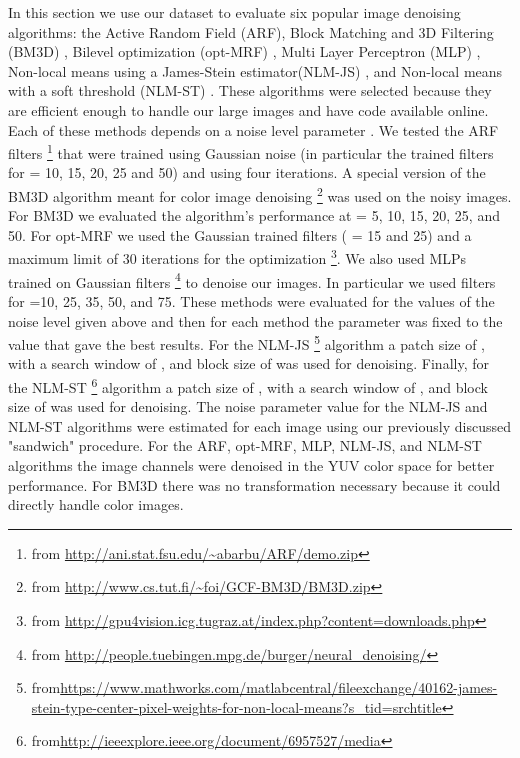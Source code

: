\documentclass[review]{elsarticle}
\begin{document}
In this section we use our dataset to evaluate six popular image denoising algorithms: the Active Random Field (ARF)\cite{barbu2009training}, Block Matching and 3D Filtering (BM3D) \cite{dabov2007image}, Bilevel optimization (opt-MRF) \cite{optMRF}, Multi Layer Perceptron (MLP) \cite{NeuralNetworkCompete}, Non-local means using a James-Stein estimator(NLM-JS) \cite{JS-NLM}, and Non-local means with a soft threshold (NLM-ST) \cite{lu2015non}. These algorithms were selected because they are efficient enough to handle our large images and have code available online. Each of these methods depends on a noise level parameter . We tested the ARF filters \footnote{from \url{http://ani.stat.fsu.edu/~abarbu/ARF/demo.zip}} that were trained using Gaussian noise (in particular the trained filters for  = 10, 15, 20, 25 and 50) and using four iterations. A special version of the BM3D algorithm meant for color image denoising \footnote{from \url{http://www.cs.tut.fi/~foi/GCF-BM3D/BM3D.zip}} was used on the noisy images. For BM3D we evaluated the algorithm's performance at  = 5, 10, 15, 20, 25, and 50. For opt-MRF we used the Gaussian trained filters ( = 15 and 25)  and a maximum limit of 30 iterations for the optimization \footnote{from \url{http://gpu4vision.icg.tugraz.at/index.php?content=downloads.php}}. We also used MLPs trained on Gaussian filters 
\footnote{from \url{http://people.tuebingen.mpg.de/burger/neural_denoising/}} to denoise our images. In particular we used filters for  =10, 25, 35, 50, and 75. These methods were evaluated for the values of the noise level  given above and then  for each method the parameter was fixed to the value that gave the best results. 
For the NLM-JS \footnote{from\url{https://www.mathworks.com/matlabcentral/fileexchange/40162-james-stein-type-center-pixel-weights-for-non-local-means?s_tid=srchtitle}} algorithm a patch size of , with a search window of , and block size of  was used for denoising. Finally, for the NLM-ST \footnote{from\url{http://ieeexplore.ieee.org/document/6957527/media}} algorithm a patch size of , with a search window of , and block size of  was used for denoising. 
The noise parameter value for the NLM-JS and NLM-ST algorithms were estimated for each image using our previously discussed "sandwich" procedure. For the ARF, opt-MRF, MLP, NLM-JS, and NLM-ST algorithms the image channels were denoised in the YUV color space for better performance. For BM3D there was no transformation necessary because it could directly handle color images.
\end{document}
